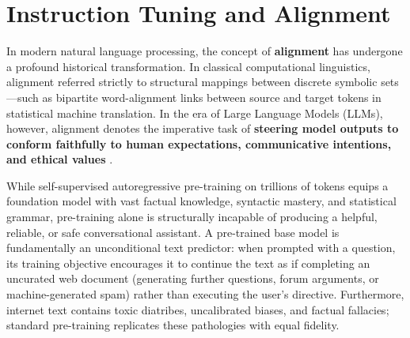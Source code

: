 \documentclass[../../main.tex]{subfiles}
\begin{document}
\chapter{Instruction Tuning and Alignment}
\label{ch:instruction_tuning_alignment}

In modern natural language processing, the concept of \textbf{alignment} has undergone a profound historical transformation. In classical computational linguistics, alignment referred strictly to structural mappings between discrete symbolic sets---such as bipartite word-alignment links between source and target tokens in statistical machine translation. In the era of Large Language Models (LLMs), however, alignment denotes the imperative task of \textbf{steering model outputs to conform faithfully to human expectations, communicative intentions, and ethical values} \citep{xiao2025}.

While self-supervised autoregressive pre-training on trillions of tokens equips a foundation model with vast factual knowledge, syntactic mastery, and statistical grammar, pre-training alone is structurally incapable of producing a helpful, reliable, or safe conversational assistant. A pre-trained base model is fundamentally an unconditional text predictor: when prompted with a question, its training objective encourages it to continue the text as if completing an uncurated web document (generating further questions, forum arguments, or machine-generated spam) rather than executing the user's directive. Furthermore, internet text contains toxic diatribes, uncalibrated biases, and factual fallacies; standard pre-training replicates these pathologies with equal fidelity.
\end{document}
